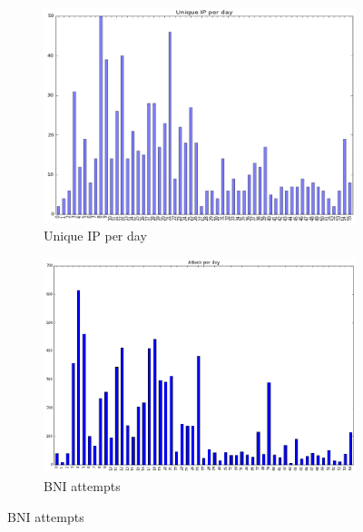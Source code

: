 \begin{figure}[ht]
    \begin{subfigure}[ht]{0.5\linewidth}
        \caption{Unique IP per day}
        \centering
        \includegraphics[width=\textwidth]{images/uni_ip_day}
    \end{subfigure}
\quad
    \begin{subfigure}[ht]{0.5\textwidth}
        \caption{BNI attempts}
        \centering
        \includegraphics[width=\linewidth]{images/att_day}
    \end{subfigure}

\end{figure}


